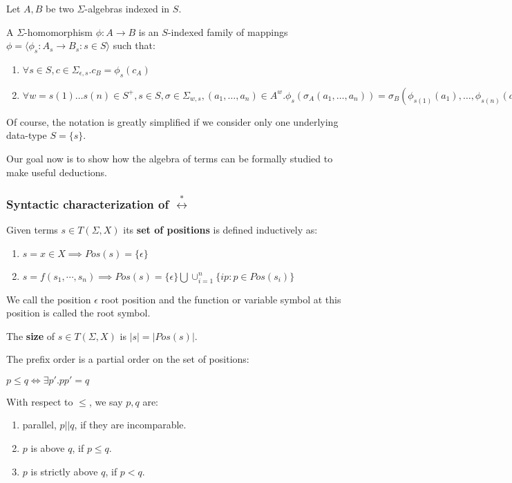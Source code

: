 \begin{definition}
Let $A,B$ be two $\Sigma$-algebras indexed in $S$. 

A $\Sigma$-homomorphism $\phi:A \to B$ is an $S$-indexed family of mappings $\phi = \langle \phi_s:A_s \to B_s:s \in S \rangle$ such that:

\begin{enumerate}
\item $\forall s \in S,c \in \Sigma_{\epsilon,s}.c_B = \phi_s(c_A)$
\item $\forall w = s(1) \ldots s(n) \in S^+,s \in S,\sigma \in \Sigma_{w,s},(a_1,\ldots,a_n) \in A^w.\phi_s(\sigma_A(a_1,\ldots,a_n)) = \sigma_B(\phi_{s(1)}(a_1),\ldots,\phi_{s(n)}(a_n))$
\end{enumerate}
\end{definition}

Of course, the notation is greatly simplified if we consider only one underlying data-type $S = \{s\}$.

Our goal now is to show how the algebra of terms can be formally studied to make useful deductions.

\subsubsection{Syntactic characterization of $\stackrel{*}{\leftrightarrow}$}

\begin{definition}
Given terms $s \in T(\Sigma,X)$ its \textbf{set of positions} is defined inductively as:

\begin{enumerate}
\item $s = x \in X \implies Pos(s) = \{\epsilon\}$
\item $s = f(s_1,\cdots,s_n) \implies Pos(s) = \{\epsilon\} \bigcup \cup_{i=1}^{n} \{ip:p \in Pos(s_i)\}$
\end{enumerate}

We call the position $\epsilon$ root position and the function or variable symbol at this position is called the root symbol. 

The \textbf{size} of $s \in T(\Sigma,X)$ is $|s| = |Pos(s)|$. 
\end{definition}

\begin{definition}
The prefix order is a partial order on the set of positions: 

$p \leq q \iff \exists p'. pp' = q$

With respect to $\leq$, we say $p,q$ are:

\begin{enumerate}
\item parallel, $p||q$, if they are incomparable.
\item $p$ is above $q$, if $p \leq q$.
\item $p$ is strictly above $q$, if $p < q$.   
\end{enumerate} 
\end{definition}


